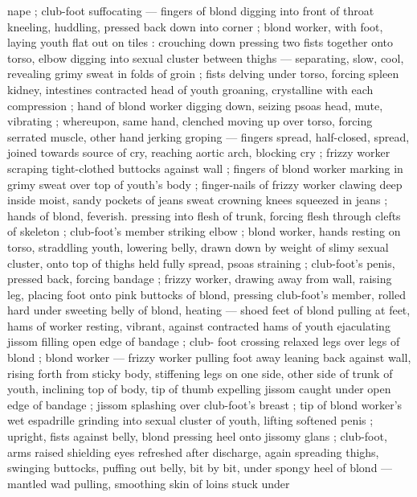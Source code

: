 nape ; club-foot suffocating --- fingers of blond digging into front of 
throat {\dashcom} kneeling, huddling, pressed back down into corner ; blond 
worker, with foot, laying youth flat out on tiles : crouching down 
pressing two fists together onto torso, elbow digging into sexual 
cluster between thighs --- separating, slow, cool, revealing grimy 
sweat in folds of groin ; fists delving under torso, forcing spleen 
kidney, intestines {\col} contracted head of youth groaning, crystalline 
with each compression ; hand of blond worker digging down, seizing 
psoas {\col} head, mute, vibrating ; whereupon, same hand, clenched 
moving up over torso, forcing serrated muscle, other hand jerking 
groping --- fingers spread, half-closed, spread, joined {\dashcom} towards 
source of cry, reaching aortic arch, blocking cry ; frizzy worker 
scraping tight-clothed buttocks against wall ; fingers of blond worker 
marking in grimy sweat over top of youth's body ; finger-nails of 
frizzy worker clawing deep inside moist, sandy pockets of jeans 
sweat crowning knees squeezed in jeans ; hands of blond, feverish. 
pressing into flesh of trunk, forcing flesh through clefts of skeleton 
; club-foot's member striking elbow ; blond worker, hands resting on 
torso, straddling youth, lowering belly, drawn down by weight of 
slimy sexual cluster, onto top of thighs held fully spread, psoas
straining ; club-foot's penis, pressed back, forcing bandage ; frizzy 
worker, drawing away from wall, raising leg, placing foot onto pink 
buttocks of blond, pressing {\col} club-foot's member, rolled hard under 
sweeting belly of blond, heating --- shoed feet of blond pulling at 
feet, hams of worker resting, vibrant, against contracted hams of 
youth {\dashcom} ejaculating {\col} jissom filling open edge of bandage ; club- 
foot crossing relaxed legs over legs of blond ; blond worker --- frizzy 
worker pulling foot away {\dashcom} leaning back against wall, rising forth 
from sticky body, stiffening legs on one side, other side of trunk of 
youth, inclining top of body, tip of thumb expelling jissom caught 
under open edge of bandage ; jissom splashing over club-foot's 
breast ; tip of blond worker's wet espadrille grinding into sexual 
cluster of youth, lifting softened penis ; upright, fists against belly, 
blond pressing heel onto jissomy glans ; club-foot, arms raised 
shielding eyes refreshed after discharge, again spreading thighs, 
swinging buttocks, puffing out belly, bit by bit, under spongy heel of 
blond --- mantled wad pulling, smoothing skin of loins stuck under 
